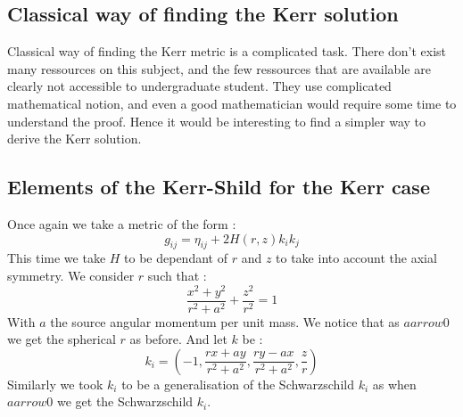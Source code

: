 \documentclass[a4paper,12pt]{article}
\theoremstyle{definition}
\begin{document}
\subsection{Classical way of finding the Kerr solution}
Classical way of finding the Kerr metric is a complicated task.
There don't exist many ressources on this subject, and the few ressources that are available are clearly not accessible to undergraduate student.
They use complicated mathematical notion, and even a good mathematician would require some time to understand the proof.
Hence it would be interesting to find a simpler way to derive the Kerr solution.
\subsection{Elements of the Kerr-Shild for the Kerr case}
Once again we take a metric of the form :
\begin{equation*}
	g_{ij}=\eta_{ij}+2H(r,z)k_ik_j
\end{equation*}
This time we take $H$ to be dependant of $r$ and $z$ to take into account the axial symmetry.
We consider $r$ such that :
\begin{equation*}
	\frac{x^2+y^2}{r^2+a^2}+\frac{z^2}{r^2}=1
\end{equation*}
With $a$ the source angular momentum per unit mass.
We notice that as $aarrow 0$ we get the spherical $r$ as before.
And let $k$ be :
\begin{equation*}
	k_i=(-1,\frac{r x + a y}{r^2 + a^2},\frac{ry-ax}{r^2+a^2},\frac{z}{r})
\end{equation*}
Similarly we took $k_i$ to be a generalisation of the Schwarzschild $k_i$ as when $aarrow 0$ we get the Schwarzschild $k_i$.
\end{document}
